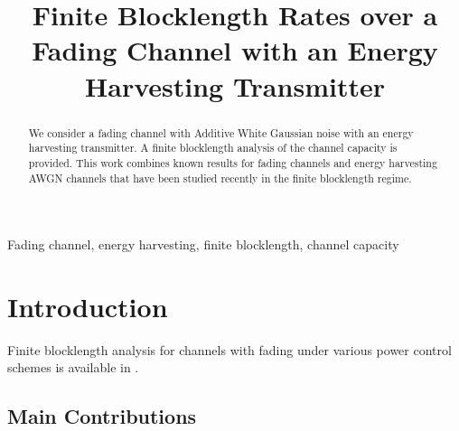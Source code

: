 \documentclass[conference]{IEEEtran}
\begin{document}
\title{Finite Blocklength Rates over a Fading Channel with an Energy Harvesting Transmitter\\
}

\author{
\and
{}
\and
{}
}

\maketitle

\begin{abstract}
We consider a fading channel with Additive White Gaussian noise with an energy harvesting transmitter. A finite blocklength analysis of the channel capacity is provided. This work combines known results for fading channels and energy harvesting AWGN channels that have been studied recently in the finite blocklength regime.
\end{abstract}

\begin{IEEEkeywords}
Fading channel, energy harvesting, finite blocklength, channel capacity
\end{IEEEkeywords}

\section{Introduction}
Finite blocklength analysis for channels with fading under various power control schemes is available in \cite{deeks2018}.

\subsection{Main Contributions}
\end{document}
